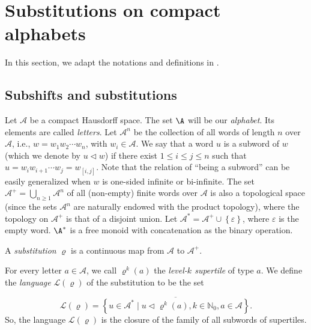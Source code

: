 \section{Substitutions on compact alphabets} \label{sec:alph}


In this section, we adapt the notations and definitions in \cite{MRW2}. 
\subsection{Subshifts and substitutions}

%

Let $\mathcal{A}$ be a compact Hausdorff space. The set $\A$ will be our \emph{alphabet}. Its elements are called \emph{letters}.  Let $\mathcal{A}^n$ be the collection of all words of length $n$ over $\mathcal{A}$, i.e., $w=w_1w_2\cdots w_n$, with $w_i\in\mathcal{A}$. 
We say that a %
word $u$ is a subword of $w$ (which we denote by $u\triangleleft w$) if there exist $1\leqslant i \leqslant j\leqslant n$ such that $u=w_iw_{i+1}\cdots w_{j}= w_{[i,j]}$. Note that the relation of ``being a subword'' can be easily generalized when $w$ is one-sided infinite or bi-infinite.
The set $\mathcal{A}^{+}=\bigcup_{n\geqslant 1} \mathcal{A}^n$ 
of all (non-empty) finite words over $\mathcal{A}$ is also a topological space (since the sets $\mathcal{A}^n$ are naturally endowed with the product topology), where the topology on $\mathcal{A}^{+}$ is that of a disjoint union. Let $\mathcal{A}^{\ast}=\mathcal{A}^{+}\cup \left\{\varepsilon\right\}$, where $\varepsilon$ is the empty word. 
$\A^*$ is a free monoid with concatenation as the binary operation. 

\begin{definition}
A {\it substitution} $\varrho$ is a continuous map from $\mathcal{A}$ to $\mathcal{A}^{+}$. 
\end{definition}

For every letter $a\in \mathcal A$, we call $\varrho^{k}(a)$ the \emph{level-$k$ supertile} of type $a$. 
We define the \emph{language} $\mathcal{L}(\varrho)$ of the substitution to be the set 

%
%
%
%
%
\[
\mathcal{L}(\mathcal{\varrho})=\overline{\left\{
u\in \mathcal{A}^{\ast}\mid u \triangleleft \varrho^{k}(a), k\in\mathbb{N}_0,a\in\mathcal{A}\right\}}. 
\]
So, the language $\mathcal{L}(\varrho)$ is the closure of the family of all subwords of supertiles.

